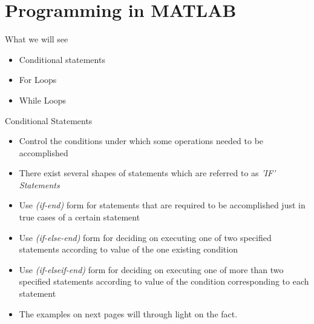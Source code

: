 \documentclass{beamer}
\begin{document}
\section{Programming in MATLAB}

\begin{frame}{What we will see}
	\begin{block}{}
		\begin{itemize}
			\item Conditional statements
			\item For Loops
			\item While Loops
		\end{itemize}
	\end{block}
\end{frame}


\begin{frame}[fragile]{Conditional Statements}
	\begin{block}{}
		\begin{itemize}
			\item Control the conditions under which some operations needed to be accomplished
			\item There exist several shapes of statements which are referred to as \textit{'IF' Statements}
			\item Use \textit{(if-end)} form for statements that are required to be accomplished just in true cases of a certain statement
			\item Use \textit{(if-else-end)} form for deciding on executing one of two specified statements according to value of the one existing condition
			\item Use \textit{(if-elseif-end)} form for deciding on executing one of more than two specified statements according to value of the condition corresponding to each statement
			\item The examples on next pages will through light on the fact.
		\end{itemize}
	\end{block}
\end{frame}
\end{document}
